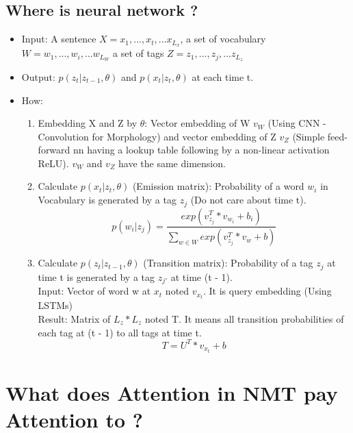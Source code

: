 \documentclass{article}
\begin{document}
\subsection{Where is neural network ?}
\begin{itemize}
\item Input: A sentence $X = x_{1},..., x_{t},... x_{L_{x}}$, a set of vocabulary $W = w_{1},..., w_{i},... w_{L_{W}}$ a set of tags $Z = z_{1},..., z_{j},... z_{L_{z}}$
\item Output: $p(z_{t}|z_{t-1},\theta)$ and $p(x_{t}|z_{t},\theta)$ at each time t.
\item How:
	\begin{enumerate}
	\item Embedding X and Z by $\theta$: Vector embedding of W $v_{W}$ (Using CNN - Convolution for Morphology) and vector embedding of Z $v_{Z}$ (Simple feed-forward nn having a lookup table following by a non-linear activation ReLU). $v_{W}$ and $v_{Z}$ have the same dimension.
	\item Calculate $p(x_{t}|z_{t},\theta)$ (Emission matrix): Probability of a word $w_{i}$ in Vocabulary is generated by a tag $z_{j}$ (Do not care about time t).
	\begin{equation}
	p(w_{i}|z_{j}) = \frac{exp(v_{z_{j}}^{T}*v_{w_{i}} + b_{i})}{\sum_{w \in W} exp(v_{z_{j}}^{T}*v_{w} + b)}
	\end{equation}

	\item Calculate $p(z_{t}|z_{t-1},\theta)$ (Transition matrix): Probability of a tag $z_{j}$ at time t is generated by a tag $z_{j'}$ at time (t - 1).\\
	Input: Vector of word w at $x_{t}$ noted $v_{x_{t}}$. It is query embedding (Using LSTMs) \\
	Result: Matrix of $L_{z}*L_{z}$ noted T. It means all transition probabilities of each tag at (t - 1) to all tags at time t.\\
	\begin{equation}
	T = U^{T}*v_{x_{t}} + b
	\end{equation}
	\end{enumerate}
\end{itemize}


\section{What does Attention in NMT pay Attention to ? \citep{Ghader2017what} }
\end{document}
